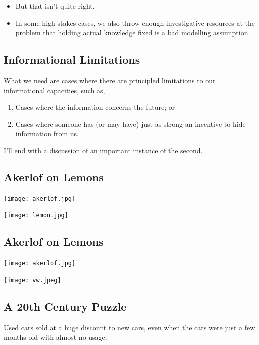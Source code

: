 \documentclass[
  11pt,
  letterpaper,
  DIV=11,
  numbers=noendperiod,
  oneside]{scrartcl}
\providecommand{\tightlist}{%
  \setlength{\itemsep}{0pt}\setlength{\parskip}{0pt}}\usepackage{longtable,booktabs,array}
\begin{document}
\begin{itemize}
\tightlist
\item
  But that isn't quite right.
\item
  In some high stakes cases, we also throw enough investigative
  resources at the problem that holding actual knowledge fixed is a bad
  modelling assumption.
\end{itemize}

\subsection{Informational Limitations}\label{informational-limitations}

What we need are cases where there are principled limitations to our
informational capacities, such as,

\begin{enumerate}
\def\labelenumi{\arabic{enumi}.}
\tightlist
\item
  Cases where the information concerns the future; or
\item
  Cases where someone has (or may have) just as strong an incentive to
  hide information from us.
\end{enumerate}

I'll end with a discussion of an important instance of the
second.

\subsection{Akerlof on Lemons}\label{akerlof-on-lemons}

\texttt{[image: akerlof.jpg]}

\texttt{[image: lemon.jpg]}

\subsection{Akerlof on Lemons}\label{akerlof-on-lemons-1}

\texttt{[image: akerlof.jpg]}

\texttt{[image: vw.jpeg]}

\subsection{A 20th Century Puzzle}\label{a-20th-century-puzzle}

Used cars sold at a huge discount to new cars, even when the cars were
just a few months old with almost no usage.
\end{document}
